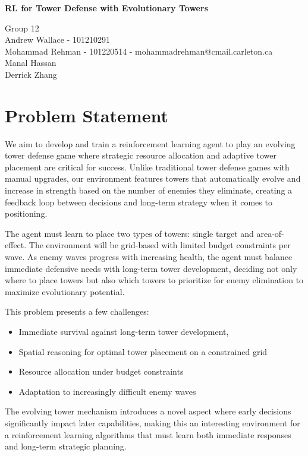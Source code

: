 \documentclass[12pt]{article}
\begin{document}
 

\begin{center} \Large\bf
RL for Tower Defense with Evolutionary Towers\\
\end{center} 

\begin{center}
Group 12 \\
Andrew Wallace - 101210291 \\
Mohammad Rehman - 101220514 - mohammadrehman@cmail.carleton.ca \\
Manal Hassan \\
Derrick Zhang
\end{center}

\section*{Problem Statement}
We aim to develop and train a reinforcement learning agent to play an evolving tower defense game where strategic resource allocation and adaptive tower placement are critical for success. Unlike traditional tower defense games with manual upgrades, our environment features towers that automatically evolve and increase in strength based on the number of enemies they eliminate, creating a feedback loop between decisions and long-term strategy when it comes to positioning.\par
The agent must learn to place two types of towers: single target and area-of-effect. The environment will be grid-based with limited budget constraints per wave. As enemy waves progress with increasing health, the agent must balance immediate defensive needs with long-term tower development, deciding not only where to place towers but also which towers to prioritize for enemy elimination to maximize evolutionary potential.\par

This problem presents a few challenges: 
\begin{itemize}
    \item Immediate survival against long-term tower development,
    \item Spatial reasoning for optimal tower placement on a constrained grid
    \item Resource allocation under budget constraints
    \item Adaptation to increasingly difficult enemy waves
\end{itemize}
The evolving tower mechanism introduces a novel aspect where early decisions significantly impact later capabilities, making this an interesting environment for a reinforcement learning algorithms that must learn both immediate responses and long-term strategic planning.
\end{document}
